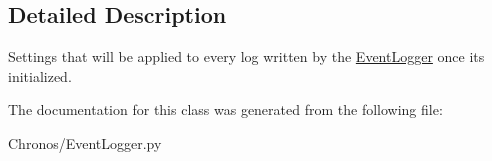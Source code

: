\subsection{Detailed Description}
Settings that will be applied to every log written by the \hyperlink{classChronos_1_1EventLogger_1_1EventLogger}{Event\+Logger} once it\textquotesingle{}s initialized. 

The documentation for this class was generated from the following file\+:\begin{DoxyCompactItemize}
\item 
Chronos/Event\+Logger.\+py\end{DoxyCompactItemize}
